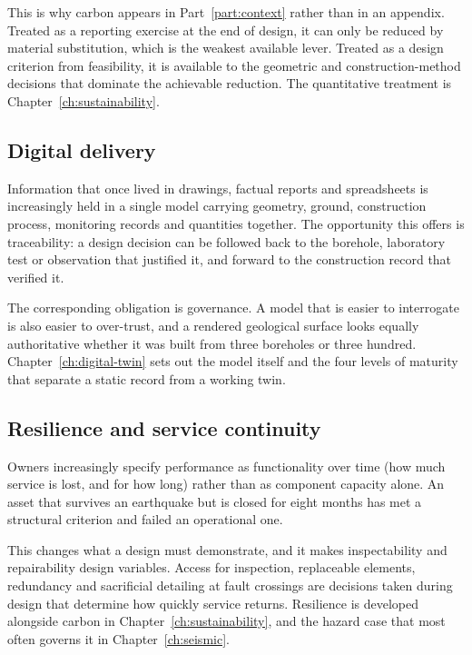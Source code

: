 This is why carbon appears in Part~\ref{part:context} rather than in an
appendix. Treated as a reporting exercise at the end of design, it can only be
reduced by material substitution, which is the weakest available lever.
Treated as a design criterion from feasibility, it is available to the
geometric and construction-method decisions that dominate the achievable
reduction. The quantitative treatment is Chapter~\ref{ch:sustainability}.

\subsection{Digital delivery}
\label{sec:digital-driver}

Information that once lived in drawings, factual reports and spreadsheets is
increasingly held in a single model carrying geometry, ground, construction
process, monitoring records and quantities together. The opportunity this
offers is traceability: a design decision can be followed back to the borehole,
laboratory test or observation that justified it, and forward to the
construction record that verified it.

The corresponding obligation is governance. A model that is easier to interrogate is also
easier to over-trust, and a rendered geological surface looks equally
authoritative whether it was built from three boreholes or three hundred.
Chapter~\ref{ch:digital-twin} sets out the model itself and the four levels of
maturity that separate a static record from a working twin.

\subsection{Resilience and service continuity}
\label{sec:resilience-driver}

Owners increasingly specify performance as functionality over time (how
much service is lost, and for how long) rather than as component capacity
alone. An asset that survives an earthquake but is closed for eight months has
met a structural criterion and failed an operational one.

This changes what a design must demonstrate, and it makes inspectability and
repairability design variables. Access for
inspection, replaceable elements, redundancy and sacrificial detailing at
fault crossings are decisions taken during design that determine how quickly
service returns. Resilience is developed alongside carbon in
Chapter~\ref{ch:sustainability}, and the hazard case that most often governs
it in Chapter~\ref{ch:seismic}.

